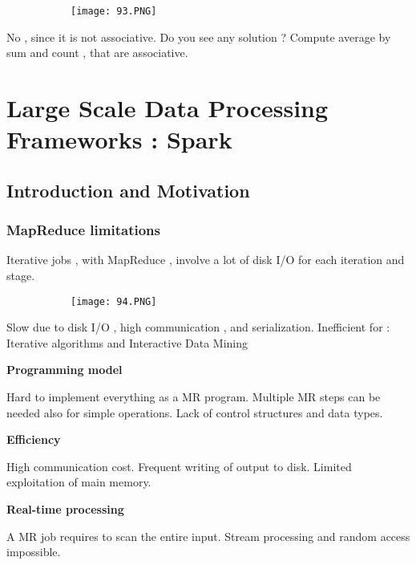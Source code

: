 \documentclass{article}
\begin{document}
\begin{figure}[ht!]
  \centering
  \begin{subfigure}[b]{0.5\linewidth}
    \texttt{[image: 93.PNG]}
  \end{subfigure}
\end{figure}

No , since it is not associative. 
Do you see any solution ? Compute average by sum and count , that are associative.

\section{Large Scale Data Processing Frameworks : Spark}
\subsection{Introduction and Motivation}

\subsubsection{MapReduce limitations}
Iterative jobs , with MapReduce , involve a lot of disk I/O for each iteration and stage.

\begin{figure}[ht!]
  \centering
  \begin{subfigure}[b]{0.5\linewidth}
    \texttt{[image: 94.PNG]}
  \end{subfigure}
\end{figure}

Slow due to disk I/O , high communication , and serialization.
Inefficient for : Iterative algorithms and Interactive Data Mining

\vspace{3mm}
\textbf{Programming model}

Hard to implement everything as a MR program. 
Multiple MR steps can be needed also for simple operations.
Lack of control structures and data types.

\vspace{3mm}
\textbf{Efficiency}

High communication cost.
Frequent writing of output to disk.
Limited exploitation of main memory.

\vspace{3mm}
\textbf{Real-time processing}

A MR job requires to scan the entire input.
Stream processing and random access impossible.
\end{document}
